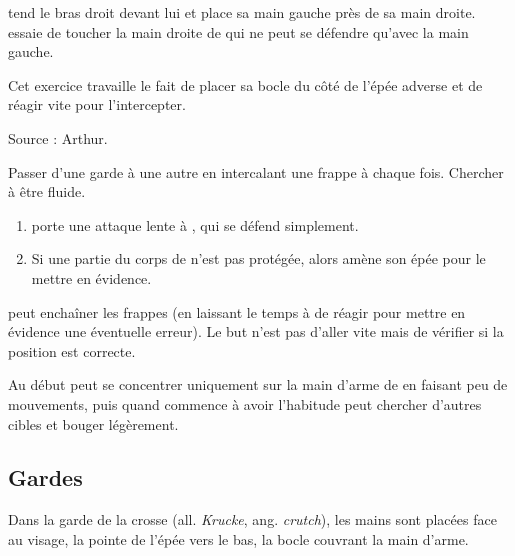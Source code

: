 \begin{exercice}

\D tend le bras droit devant lui et place sa main gauche près de sa main droite. 
\A essaie de toucher la main droite de \D qui ne peut se défendre qu'avec la main gauche.

Cet exercice travaille le fait de placer sa bocle du côté de l'épée adverse et de réagir vite pour l'intercepter.

Source : Arthur.

\end{exercice}


\begin{exercice}

Passer d'une garde à une autre en intercalant une frappe à chaque fois.
Chercher à être fluide.

\end{exercice}


\begin{exercice}

\begin{enumerate}
	\item \A porte une attaque lente à \D, qui se défend simplement.
	\item Si une partie du corps de \A n'est pas protégée, alors \D amène son épée pour le mettre en évidence.
\end{enumerate}

\A peut enchaîner les frappes (en laissant le temps à \D de réagir pour mettre en évidence une éventuelle erreur).
Le but n'est pas d'aller vite mais de vérifier si la position est correcte.

Au début \D peut se concentrer uniquement sur la main d'arme de \A en faisant peu de mouvements, puis quand \A commence à avoir l'habitude \D peut chercher d'autres cibles et bouger légèrement.

\end{exercice}


\subsection{Gardes}


\begin{garde}

Dans la garde de la crosse (all. \emph{Krucke}, ang. \emph{crutch}), les mains sont placées face au visage, la pointe de l'épée vers le bas, la bocle couvrant la main d'arme.

\end{garde}

